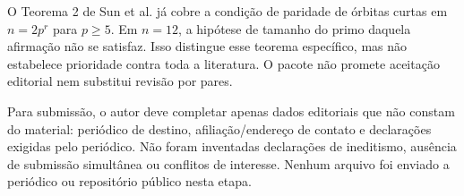 \documentclass[11pt,a4paper]{article}
\begin{document}
O Teorema 2 de Sun et al. já cobre a condição de paridade de órbitas
curtas em $n=2p^r$ para $p\ge5$. Em $n=12$, a hipótese de tamanho do
primo daquela afirmação não se satisfaz. Isso distingue esse teorema
específico, mas não estabelece prioridade contra toda a literatura.
O pacote não promete aceitação editorial nem substitui revisão por pares.

Para submissão, o autor deve completar apenas dados editoriais que não
constam do material: periódico de destino, afiliação/endereço de contato
e declarações exigidas pelo periódico. Não foram inventadas declarações
de ineditismo, ausência de submissão simultânea ou conflitos de interesse.
Nenhum arquivo foi enviado a periódico ou repositório público nesta etapa.
\end{document}
